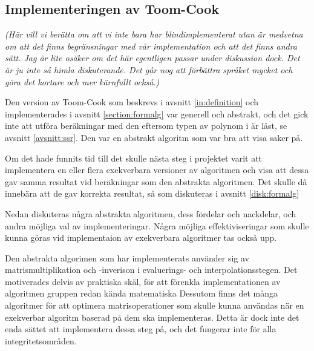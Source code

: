 \subsection{Implementeringen av Toom-Cook}
\emph{(Här vill vi berätta om att vi inte bara har blindimplementerat utan är medvetna 
om att det finns begränsningar med vår implementation och att det finns andra sätt. Jag är 
lite osäker om det här egentligen passar under diskussion dock. Det är ju inte så himla
diskuterande. Det går nog att förbättra språket mycket och göra det kortare och mer kärnfullt också.)}

Den version av Toom-Cook som beskrevs i avsnitt \ref{in:definition} och 
implementerades i avsnitt \ref{section:formalg} var generell och abstrakt, 
och det gick inte att utföra beräkningar med den eftersom typen av polynom i \ssr är låst, 
se avsnitt \ref{avsnitt:ssr}. Den var en abstrakt algoritm som var bra att
visa saker på.

Om det hade funnits tid till det skulle nästa steg i projektet varit att implementera
en eller flera exekverbara versioner av algoritmen och visa att dessa 
gav samma resultat vid beräkningar som den abstrakta algoritmen. Det skulle då 
innebära att de gav
korrekta resultat, så som diskuteras i avsnitt \ref{disk:formalg}

Nedan diskuteras några  abstrakta 
algoritmen, dess fördelar och nackdelar, och andra möjliga val av implementeringar. 
Några möjliga effektiviseringar som skulle kunna göras vid 
implementaion av exekverbara algoritmer tas också upp.

Den abstrakta algorimen som har implementerats använder sig av matrismultiplikation
och -inverison
i evaluerings- och interpolationsstegen. Det motiverades delvis av praktiska
skäl, för att förenkla implementationen av algoritmen gruppen redan kända matematiska 
Dessutom finns det många algoritmer för att optimera matrisoperationer som skulle kunna
användas när en exekverbar algoritm baserad på dem ska implementeras. Detta är dock 
inte det enda sättet att implementera dessa steg på, och det fungerar inte för 
alla integritetsområden.



